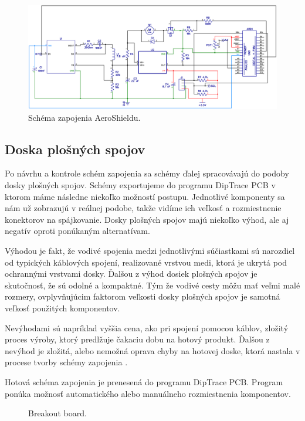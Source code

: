 \begin{figure}[!tbh]
	\includegraphics[width=\textwidth]{obr/aeroSchema.png}
	\caption{Schéma zapojenia AeroShieldu.}\label{OBRAZOK 2.3.5}
\end{figure}

\subsection{Doska plošných spojov}
\label{PCBcka}

Po návrhu a kontrole schém zapojenia sa schémy ďalej spracovávajú do podoby dosky plošných spojov. Schémy exportujeme do programu DipTrace PCB v ktorom máme následne niekoľko možností postupu. Jednotlivé komponenty sa nám už zobrazujú v reálnej podobe, takže vidíme ich veľkosť a rozmiestnenie konektorov na spájkovanie. Dosky plošných spojov majú niekoľko výhod, ale aj negatív oproti ponúkaným alternatívam\cite{dosky}. 

Výhodou je fakt, že vodivé spojenia medzi jednotlivými súčiastkami sú narozdiel od typických káblových spojení, realizované vrstvou medi, ktorá je ukrytá pod ochrannými vrstvami dosky. Ďalšou z výhod dosiek plošných spojov je skutočnosť, že sú odolné a kompaktné\cite{PCBlife}. Tým že vodivé cesty môžu mať veľmi malé rozmery, ovplyvňujúcim faktorom veľkosti dosky plošných spojov je samotná veľkosť použitých komponentov. 

Nevýhodami sú napríklad vyššia cena, ako pri spojení pomocou káblov, zložitý proces výroby, ktorý predlžuje čakaciu dobu na hotový produkt. Ďalšou z nevýhod je zložitá, alebo nemožná oprava chyby na hotovej doske, ktorá nastala v procese tvorby schémy zapojenia . 

Hotová schéma zapojenia je prenesená do programu DipTrace PCB. Program ponúka možnosť automatického alebo manuálneho rozmiestnenia komponentov.

\begin{figure}[!tbh]
	\hfill
	\hfill
	\hfill
	\caption{Breakout board.}\label{OBRAZOK 2.6}
\end{figure}

